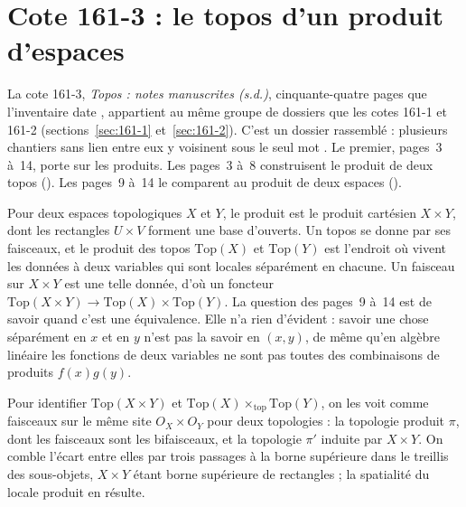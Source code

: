 \section[Cote 161-3 : le topos d'un produit d'espaces]{Cote 161-3 : le topos d'un produit d'espaces\protect{}}\label{sec:161-3}

La cote 161-3, \emph{Topos : notes manuscrites (s.d.)}, cinquante-quatre pages que l'inventaire date \q{[vers 1963-1973]}, appartient au même groupe de dossiers que les cotes 161-1 et 161-2 (sections~\ref{sec:161-1} et~\ref{sec:161-2}). C'est un dossier rassemblé : plusieurs chantiers sans lien entre eux y voisinent sous le seul mot . Le premier, pages~3 à~14, porte sur les produits. Les pages~3 à~8 construisent le produit de deux topos (). Les pages~9 à~14 le comparent au produit de deux espaces ().

Pour deux espaces topologiques $X$ et $Y$, le produit est le produit cartésien $X \times Y$, dont les rectangles $U \times V$ forment une base d'ouverts. Un topos se donne par ses faisceaux, et le produit des topos $\mathrm{Top}(X)$ et $\mathrm{Top}(Y)$ est l'endroit où vivent les données à deux variables qui sont locales séparément en chacune. Un faisceau sur $X \times Y$ est une telle donnée, d'où un foncteur $\mathrm{Top}(X \times Y) \to \mathrm{Top}(X) \times \mathrm{Top}(Y)$. La question des pages~9 à~14 est de savoir quand c'est une équivalence. Elle n'a rien d'évident : savoir une chose séparément en $x$ et en $y$ n'est pas la savoir en $(x, y)$, de même qu'en algèbre linéaire les fonctions de deux variables ne sont pas toutes des combinaisons de produits $f(x)g(y)$.

\begin{encadre}
\begin{methode*}
Pour identifier $\mathrm{Top}(X \times Y)$ et $\mathrm{Top}(X) \times_{\mathrm{top}} \mathrm{Top}(Y)$, on les voit comme faisceaux sur le même site $O_X \times O_Y$ pour deux topologies : la topologie produit $\pi$, dont les faisceaux sont les bifaisceaux, et la topologie $\pi'$ induite par $X \times Y$. On comble l'écart entre elles par trois passages à la borne supérieure dans le treillis des sous-objets, $X \times Y$ étant borne supérieure de rectangles ; la spatialité du locale produit en résulte.
\end{methode*}
\end{encadre}

